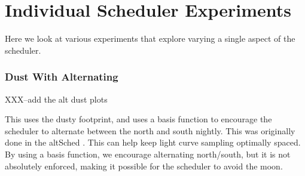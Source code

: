 

\section{Individual Scheduler Experiments}

Here we look at various experiments that explore varying a single aspect of the scheduler.







\subsubsection{Dust With Alternating}

XXX--add the alt dust plots
\begin{figure}
\caption{}\label{fig:altdust}
\end{figure}
This uses the dusty footprint, and uses a basis function to encourage the scheduler to alternate between the north and south nightly. This was originally done in the altSched \citep{Rothchild19}. This can help keep light curve sampling optimally spaced. By using a basis function, we encourage alternating north/south, but it is not absolutely enforced, making it possible for the scheduler to avoid the moon.

